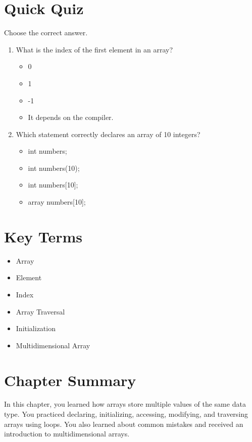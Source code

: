 \documentclass[12pt,openany]{book}
\begin{document}
\section{Quick Quiz}

Choose the correct answer.

\begin{enumerate}
    \item What is the index of the first element in an array?
    \begin{itemize}
        \item 0
        \item 1
        \item -1
        \item It depends on the compiler.
    \end{itemize}

    \item Which statement correctly declares an array of 10 integers?
    \begin{itemize}
        \item int numbers;
        \item int numbers(10);
        \item int numbers[10];
        \item array numbers[10];
    \end{itemize}
\end{enumerate}

\section{Key Terms}

\begin{itemize}
    \item Array
    \item Element
    \item Index
    \item Array Traversal
    \item Initialization
    \item Multidimensional Array
\end{itemize}

\section{Chapter Summary}

In this chapter, you learned how arrays store multiple values of the same data type. You practiced declaring, initializing, accessing, modifying, and traversing arrays using loops. You also learned about common mistakes and received an introduction to multidimensional arrays.
\end{document}
